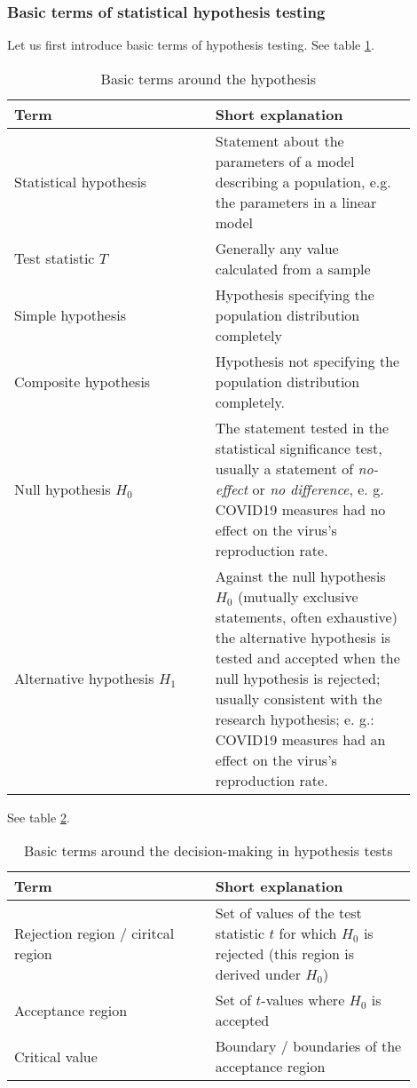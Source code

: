 \subsubsection{Basic terms of statistical hypothesis testing}
Let us first introduce basic terms of hypothesis testing.
See table \ref{tab:terms_hypothesis}.
\begin{table}
    \centering
    \begin{tabular}{|p{0.45\linewidth}|p{0.45\linewidth}|}
        \hline \textcolor{blue1}{Term} & \textcolor{blue1}{Short explanation} \\
        \hline
        Statistical hypothesis & Statement about the parameters of a model describing a population, e.g. the parameters in a linear model \\
        \hline
        Test statistic $T$ & Generally any value calculated from a sample \\
        \hline
        Simple hypothesis & Hypothesis specifying the population distribution completely \\
        \hline
        Composite hypothesis & Hypothesis not specifying the population distribution completely. \\
        \hline
        Null hypothesis $H_0$ & The statement tested in the statistical significance test, usually a statement of \textit{no-effect} or \textit{no difference}, e. g. COVID19 measures had no effect on the virus's reproduction rate. \\
        \hline
        Alternative hypothesis $H_1$ & Against the null hypothesis $H_0$ (mutually exclusive statements, often exhaustive) the alternative hypothesis is tested and accepted when the null hypothesis is rejected; usually consistent with the research hypothesis; e. g.: COVID19 measures had an effect on the virus's reproduction rate. \\
        \hline
    \end{tabular}
    \caption{Basic terms around the hypothesis}
    \label{tab:terms_hypothesis}
\end{table}

See table \ref{tab:dec_mak}.
\begin{table}
    \centering
    \begin{tabular}{|p{0.45\linewidth}|p{0.45\linewidth}|}
        \hline \textcolor{blue1}{Term} & \textcolor{blue1}{Short explanation} \\
        \hline
        Rejection region / ciritcal region & Set of values of the test statistic $t$ for which $H_0$ is rejected (this region is derived under $H_0$) \\
        \hline
        Acceptance region & Set of $t$-values where $H_0$ is accepted \\
        \hline
        Critical value & Boundary / boundaries of the acceptance region \\
        \hline
    \end{tabular}
    \caption{Basic terms around the decision-making in hypothesis tests}
    \label{tab:dec_mak}
\end{table}

